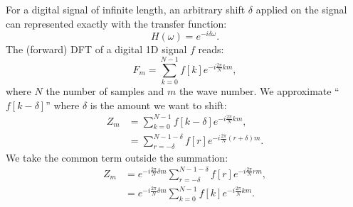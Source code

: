 \documentclass[]{usiinfbachelorproject}
\begin{document}
	For a digital signal of infinite length,  an arbitrary shift $\delta$ applied on the signal can represented exactly with the transfer function:
	\begin{equation}
		H(\omega) = e^{-i\delta\omega}.
	\end{equation}
	The (forward) DFT of a digital 1D signal $f$ reads:
	\begin{equation*}
		F_m = \displaystyle\sum_{k=0}^{N-1}f[k]e^{-i \frac{2\pi}{N} km},
	\end{equation*}
	where $N$ the number of samples and $m$ the wave number.	
	We approximate ``$f[k - \delta]$'' where $\delta$ is the amount we want to shift:
	\begin{align*}
		Z_m &= \displaystyle\sum_{k=0}^{N-1}f[k - \delta]e^{-i \frac{2\pi}{N} km},\\
		&= \displaystyle\sum_{r= -\delta}^{N-1 - \delta}f[r]e^{-i \frac{2\pi}{N} (r + \delta)m}.
	\end{align*}
	We take the common term outside the summation:
	\begin{align*}
		Z_m &= e^{-i \frac{2\pi}{N}  \delta m} \displaystyle\sum_{r= -\delta}^{N-1 - \delta}f[r]e^{-i \frac{2\pi}{N} rm},\\
		&= e^{-i \frac{2\pi}{N}  \delta m} \displaystyle\sum_{k=0}^{N-1}f[k]e^{-i \frac{2\pi}{N} km}.
	\end{align*}
\end{document}
